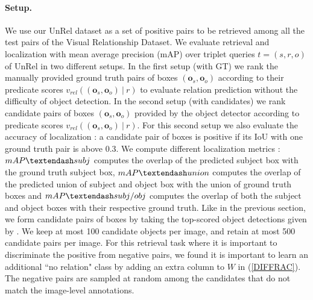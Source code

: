 \documentclass[10pt,twocolumn,letterpaper]{article}
\begin{document}
\paragraph{Setup.} 
We use our UnRel dataset as a set of positive pairs to be retrieved among all the test pairs of the Visual Relationship Dataset. We evaluate retrieval and localization with mean average precision (mAP) over triplet queries $t=(s,r,o)$ of UnRel in two different setups. In the first setup (with GT) we rank the manually provided ground truth pairs of boxes $(\bm{o}_s,\bm{o}_o)$ according to their predicate scores $v_{rel}((\bm{o}_s,\bm{o}_o) ~|~ r)$ to evaluate relation prediction without the difficulty of object detection. In the second setup (with candidates) we rank candidate pairs of boxes $(\bm{o}_s,\bm{o}_o)$ provided by the object detector according to predicate scores $v_{rel}((\bm{o}_s,\bm{o}_o) ~|~ r)$. For this second setup we also evaluate the accuracy of localization : a candidate pair of boxes is positive if its IoU with one ground truth pair is above 0.3. We compute different localization metrics : $mAP \textendash subj$ computes the overlap of the predicted subject box with the ground truth subject box, $mAP \textendash union$ computes the overlap of the predicted union of subject and object box with the union of ground truth boxes and $mAP \textendash subj/obj$ computes the overlap of both the subject and object boxes with their respective ground truth. Like in the previous section, we form candidate pairs of boxes by taking the top-scored object detections given by \cite{girshick15fastrcnn}. We keep at most 100 candidate objects per image, and retain at most 500 candidate pairs per image. For this retrieval task where it is important to discriminate the positive from negative pairs, we found it is important to learn an additional ``no relation" class by adding an extra column to $W$ in (\ref{DIFFRAC}). The negative pairs are sampled at random among the candidates that do not match the image-level annotations.
\end{document}
